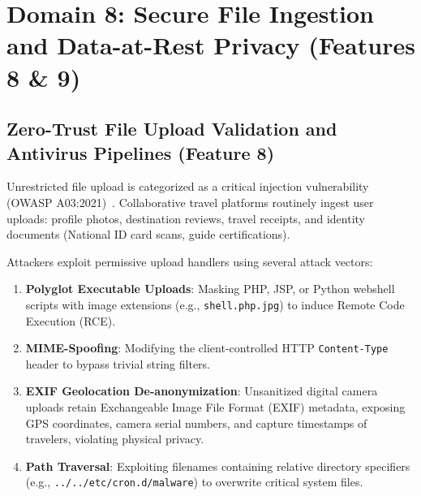 \documentclass[10pt,twocolumn,a4paper]{article}
\begin{document}
\section{Domain 8: Secure File Ingestion and Data-at-Rest Privacy (Features 8 \& 9)}

\subsection{Zero-Trust File Upload Validation and Antivirus Pipelines (Feature 8)}
Unrestricted file upload is categorized as a critical injection vulnerability (OWASP A03:2021)~\cite{owasp_top10_2021}. Collaborative travel platforms routinely ingest user uploads: profile photos, destination reviews, travel receipts, and identity documents (National ID card scans, guide certifications).

Attackers exploit permissive upload handlers using several attack vectors:
\begin{enumerate}[leftmargin=*]
    \item \textbf{Polyglot Executable Uploads}: Masking PHP, JSP, or Python webshell scripts with image extensions (e.g., \texttt{shell.php.jpg}) to induce Remote Code Execution (RCE).
    \item \textbf{MIME-Spoofing}: Modifying the client-controlled HTTP \texttt{Content-Type} header to bypass trivial string filters.
    \item \textbf{EXIF Geolocation De-anonymization}: Unsanitized digital camera uploads retain Exchangeable Image File Format (EXIF) metadata, exposing GPS coordinates, camera serial numbers, and capture timestamps of travelers, violating physical privacy.
    \item \textbf{Path Traversal}: Exploiting filenames containing relative directory specifiers (e.g., \texttt{../../etc/cron.d/malware}) to overwrite critical system files.
\end{enumerate}
\end{document}
